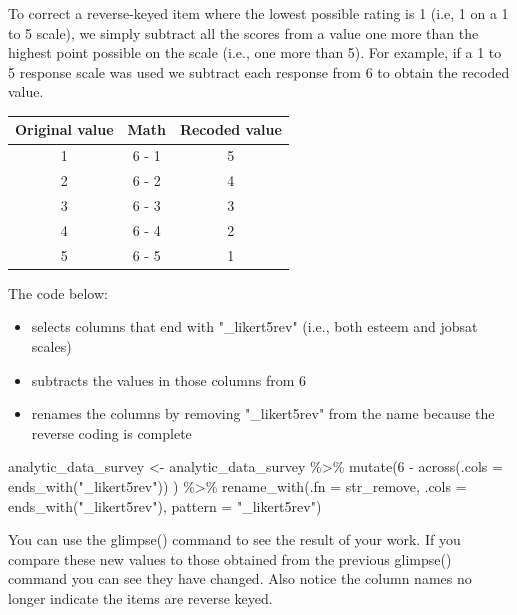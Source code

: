 \documentclass[
]{krantz}
\makeatletter
\newenvironment{Shaded}{\begin{snugshade}}{\end{snugshade}}
\newcommand{\AttributeTok}[1]{\textcolor[rgb]{0.61,0.61,0.61}{#1}}
\newcommand{\DecValTok}[1]{\textcolor[rgb]{0.06,0.06,0.06}{#1}}
\newcommand{\FunctionTok}[1]{\textcolor[rgb]{0,0,0}{#1}}
\newcommand{\NormalTok}[1]{#1}
\newcommand{\OtherTok}[1]{\textcolor[rgb]{0.37,0.37,0.37}{#1}}
\newcommand{\SpecialCharTok}[1]{\textcolor[rgb]{0,0,0}{#1}}
\newcommand{\StringTok}[1]{\textcolor[rgb]{0.5,0.5,0.5}{#1}}
\providecommand{\tightlist}{%
  \setlength{\itemsep}{0pt}\setlength{\parskip}{0pt}}
\newenvironment{kframe}{%
\medskip{}
\setlength{\fboxsep}{.8em}
 \def\at@end@of@kframe{}%
 \ifinner\ifhmode%
  \def\at@end@of@kframe{\end{minipage}}%
  \begin{minipage}{\columnwidth}%
 \fi\fi%
 \def\FrameCommand##1{\hskip\@totalleftmargin \hskip-\fboxsep
 \colorbox{shadecolor}{##1}\hskip-\fboxsep
     \hskip-\linewidth \hskip-\@totalleftmargin \hskip\columnwidth}%
 \MakeFramed {\advance\hsize-\width
   \@totalleftmargin\z@ \linewidth\hsize
   \@setminipage}}%
 {\par\unskip\endMakeFramed%
 \at@end@of@kframe}
\renewenvironment{Shaded}{\begin{kframe}}{\end{kframe}}
\makeatother
\begin{document}
To correct a reverse-keyed item where the lowest possible rating is 1 (i.e, 1 on a 1 to 5 scale), we simply subtract all the scores from a value one more than the highest point possible on the scale (i.e., one more than 5). For example, if a 1 to 5 response scale was used we subtract each response from 6 to obtain the recoded value.

\begin{longtable}[]{@{}ccc@{}}
\toprule
Original value & Math & Recoded value \\
\midrule
\endhead
1 & 6 - 1 & 5 \\
2 & 6 - 2 & 4 \\
3 & 6 - 3 & 3 \\
4 & 6 - 4 & 2 \\
5 & 6 - 5 & 1 \\
\bottomrule
\end{longtable}

The code below:

\begin{itemize}
\tightlist
\item
  selects columns that end with "\_likert5rev" (i.e., both esteem and jobsat scales)
\item
  subtracts the values in those columns from 6
\item
  renames the columns by removing "\_likert5rev" from the name because the reverse coding is complete
\end{itemize}

\begin{Shaded}
\begin{Highlighting}[]
\NormalTok{analytic\_data\_survey }\OtherTok{\textless{}{-}}\NormalTok{ analytic\_data\_survey }\SpecialCharTok{\%\textgreater{}\%} 
  \FunctionTok{mutate}\NormalTok{(}\DecValTok{6} \SpecialCharTok{{-}} \FunctionTok{across}\NormalTok{(}\AttributeTok{.cols =} \FunctionTok{ends\_with}\NormalTok{(}\StringTok{"\_likert5rev"}\NormalTok{)) ) }\SpecialCharTok{\%\textgreater{}\%} 
  \FunctionTok{rename\_with}\NormalTok{(}\AttributeTok{.fn =}\NormalTok{ str\_remove,}
              \AttributeTok{.cols =} \FunctionTok{ends\_with}\NormalTok{(}\StringTok{"\_likert5rev"}\NormalTok{),}
              \AttributeTok{pattern =} \StringTok{"\_likert5rev"}\NormalTok{)}
\end{Highlighting}
\end{Shaded}

You can use the glimpse() command to see the result of your work. If you compare these new values to those obtained from the previous glimpse() command you can see they have changed. Also notice the column names no longer indicate the items are reverse keyed.
\end{document}
